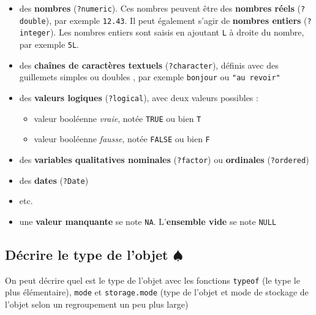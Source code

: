 \documentclass[
]{book}
\providecommand{\tightlist}{%
  \setlength{\itemsep}{0pt}\setlength{\parskip}{0pt}}
\begin{document}
\begin{itemize}
\tightlist
\item
  des \textbf{nombres} (\texttt{?numeric}). Ces nombres peuvent être des \textbf{nombres réels} (\texttt{?double}), par exemple \texttt{12.43}. Il peut également s'agir de \textbf{nombres entiers} (\texttt{?integer}). Les nombres entiers sont saisis en ajoutant \texttt{L} à droite du nombre, par exemple \texttt{5L}.
\item
  des \textbf{chaînes de caractères textuels} (\texttt{?character}), définis avec des guillemets simples ou doubles , par exemple \texttt{\textquotesingle{}bonjour\textquotesingle{}} ou \texttt{"au\ revoir"}
\item
  des \textbf{valeurs logiques} (\texttt{?logical}), avec deux valeurs possibles :

  \begin{itemize}
  \tightlist
  \item
    valeur booléenne \emph{vraie}, notée \texttt{TRUE} ou bien \texttt{T}
  \item
    valeur booléenne \emph{fausse}, notée \texttt{FALSE} ou bien \texttt{F}
  \end{itemize}
\item
  des \textbf{variables qualitatives nominales} (\texttt{?factor}) ou \textbf{ordinales} (\texttt{?ordered})
\item
  des \textbf{dates} (\texttt{?Date})
\item
  etc.
\item
  une \textbf{valeur manquante} se note \texttt{NA}. L'\textbf{ensemble vide} se note \texttt{NULL}
\end{itemize}

\subsection{\texorpdfstring{Décrire le type de l'objet \(\spadesuit\)}{Décrire le type de l'objet \textbackslash spadesuit}}\label{duxe9crire-le-type-de-lobjet-spadesuit}

On peut décrire quel est le type de l'objet avec les fonctions \texttt{typeof} (le type le plus élémentaire), \texttt{mode} et \texttt{storage.mode} (type de l'objet et mode de stockage de l'objet selon un regroupement un peu plus large)
\end{document}
